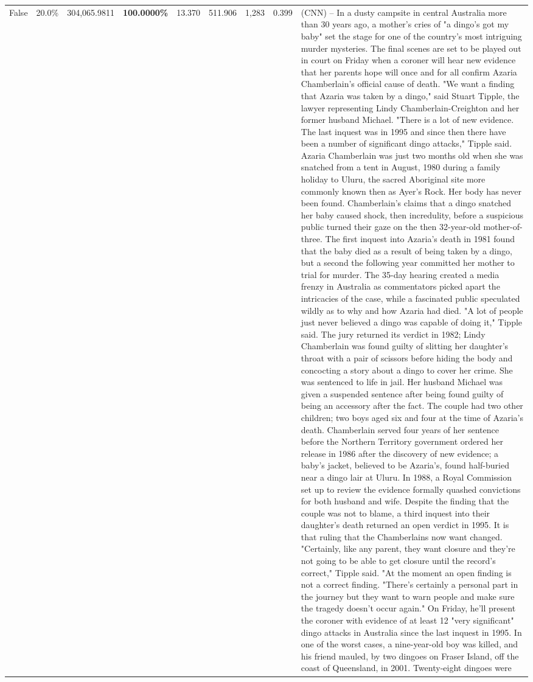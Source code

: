 \begin{table}[H]
\begin{tabular}{lllrlllll}
False & 20.0\% & 304,065.9811 & \bfseries \color{red} 100.0000\% & 13.370 & 511.906 & 1,283 & 0.399 & (CNN) -- In a dusty campsite in central Australia more than 30 years ago, a mother's cries of "a dingo's got my baby" set the stage for one of the country's most intriguing murder mysteries. The final scenes are set to be played out in court on Friday when a coroner will hear new evidence that her parents hope will once and for all confirm Azaria Chamberlain's official cause of death. "We want a finding that Azaria was taken by a dingo," said Stuart Tipple, the lawyer representing Lindy Chamberlain-Creighton and her former husband Michael. "There is a lot of new evidence. The last inquest was in 1995 and since then there have been a number of significant dingo attacks," Tipple said. Azaria Chamberlain was just two months old when she was snatched from a tent in August, 1980 during a family holiday to Uluru, the sacred Aboriginal site more commonly known then as Ayer's Rock. Her body has never been found. Chamberlain's claims that a dingo snatched her baby caused shock, then incredulity, before a suspicious public turned their gaze on the then 32-year-old mother-of-three. The first inquest into Azaria's death in 1981 found that the baby died as a result of being taken by a dingo, but a second the following year committed her mother to trial for murder. The 35-day hearing created a media frenzy in Australia as commentators picked apart the intricacies of the case, while a fascinated public speculated wildly as to why and how Azaria had died. "A lot of people just never believed a dingo was capable of doing it," Tipple said. The jury returned its verdict in 1982; Lindy Chamberlain was found guilty of slitting her daughter's throat with a pair of scissors before hiding the body and concocting a story about a dingo to cover her crime. She was sentenced to life in jail. Her husband Michael was given a suspended sentence after being found guilty of being an accessory after the fact. The couple had two other children; two boys aged six and four at the time of Azaria's death. Chamberlain served four years of her sentence before the Northern Territory government ordered her release in 1986 after the discovery of new evidence; a baby's jacket, believed to be Azaria's, found half-buried near a dingo lair at Uluru. In 1988, a Royal Commission set up to review the evidence formally quashed convictions for both husband and wife. Despite the finding that the couple was not to blame, a third inquest into their daughter's death returned an open verdict in 1995. It is that ruling that the Chamberlains now want changed. "Certainly, like any parent, they want closure and they're not going to be able to get closure until the record's correct," Tipple said. "At the moment an open finding is not a correct finding. "There's certainly a personal part in the journey but they want to warn people and make sure the tragedy doesn't occur again." On Friday, he'll present the coroner with evidence of at least 12 "very significant" dingo attacks in Australia since the last inquest in 1995. In one of the worst cases, a nine-year-old boy was killed, and his friend mauled, by two dingoes on Fraser Island, off the coast of Queensland, in 2001. Twenty-eight dingoes were 
\end{tabular}
\end{table}
